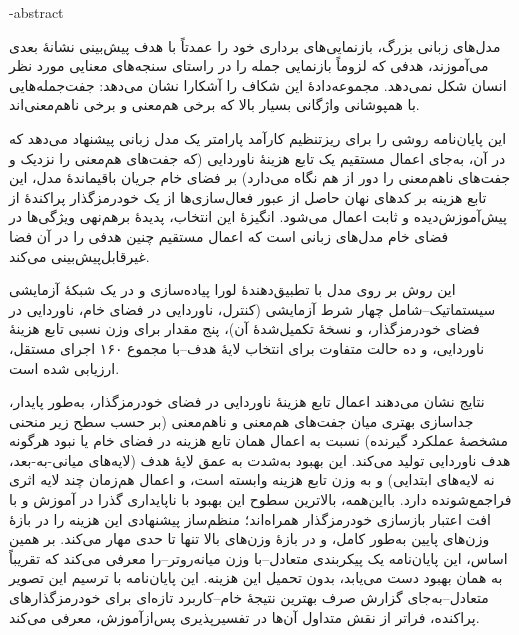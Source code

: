 \fa-abstract{
مدل‌های زبانی بزرگ، بازنمایی‌های برداری خود را عمدتاً با هدف پیش‌بینی نشانهٔ بعدی می‌آموزند، هدفی که لزوماً بازنمایی جمله را در راستای سنجه‌های معنایی مورد نظر انسان شکل نمی‌دهد. مجموعه‌دادهٔ
این شکاف را آشکارا نشان می‌دهد: جفت‌جمله‌هایی با همپوشانی واژگانی بسیار بالا که برخی هم‌معنی و برخی ناهم‌معنی‌اند.%

این پایان‌نامه روشی را برای ریزتنظیم کارآمد پارامتر یک مدل زبانی پیشنهاد می‌دهد که در آن، به‌جای اعمال مستقیم یک تابع هزینهٔ ناوردایی (که جفت‌های هم‌معنی را نزدیک و جفت‌های ناهم‌معنی را دور از هم نگاه می‌دارد) بر فضای خام جریان باقیماندهٔ مدل، این تابع هزینه بر کدهای نهان حاصل از عبور فعال‌سازی‌ها از یک خودرمزگذار پراکندهٔ از پیش‌آموزش‌دیده و ثابت اعمال می‌شود. انگیزهٔ این انتخاب، پدیدهٔ برهم‌نهی ویژگی‌ها در فضای خام مدل‌های زبانی است که اعمال مستقیم چنین هدفی را در آن فضا غیرقابل‌پیش‌بینی می‌کند.%

این روش بر روی مدل
با تطبیق‌دهندهٔ لورا پیاده‌سازی و در یک شبکهٔ آزمایشی سیستماتیک--شامل چهار شرط آزمایشی (کنترل، ناوردایی در فضای خام، ناوردایی در فضای خودرمزگذار، و نسخهٔ تکمیل‌شدهٔ آن)، پنج مقدار برای وزن نسبی تابع هزینهٔ ناوردایی، و ده حالت متفاوت برای انتخاب لایهٔ هدف--با مجموع ۱۶۰ اجرای مستقل، ارزیابی شده است.

نتایج نشان می‌دهند اعمال تابع هزینهٔ ناوردایی در فضای خودرمزگذار، به‌طور پایدار، جداسازی بهتری میان جفت‌های هم‌معنی و ناهم‌معنی (بر حسب سطح زیر منحنی مشخصهٔ عملکرد گیرنده) نسبت به اعمال همان تابع هزینه در فضای خام یا نبود هرگونه هدف ناوردایی تولید می‌کند. این بهبود به‌شدت به عمق لایهٔ هدف (لایه‌های میانی-به-بعد، نه لایه‌های ابتدایی) و به وزن تابع هزینه وابسته است، و اعمال هم‌زمان چند لایه اثری فراجمع‌شونده دارد. بااین‌همه، بالاترین سطوح این بهبود با ناپایداری گذرا در آموزش و با افت اعتبار بازسازی خودرمزگذار همراه‌اند؛ منظم‌ساز پیشنهادی این هزینه را در بازهٔ وزن‌های پایین به‌طور کامل، و در بازهٔ وزن‌های بالا تنها تا حدی مهار می‌کند. بر همین اساس، این پایان‌نامه یک پیکربندی متعادل--با وزن میانه‌رو‌تر--را معرفی می‌کند که تقریباً به همان بهبود دست می‌یابد، بدون تحمیل این هزینه. این پایان‌نامه با ترسیم این تصویر متعادل--به‌جای گزارش صرف بهترین نتیجهٔ خام--کاربرد تازه‌ای برای خودرمزگذارهای پراکنده، فراتر از نقش متداول آن‌ها در تفسیرپذیری پس‌ازآموزش، معرفی می‌کند.
}
